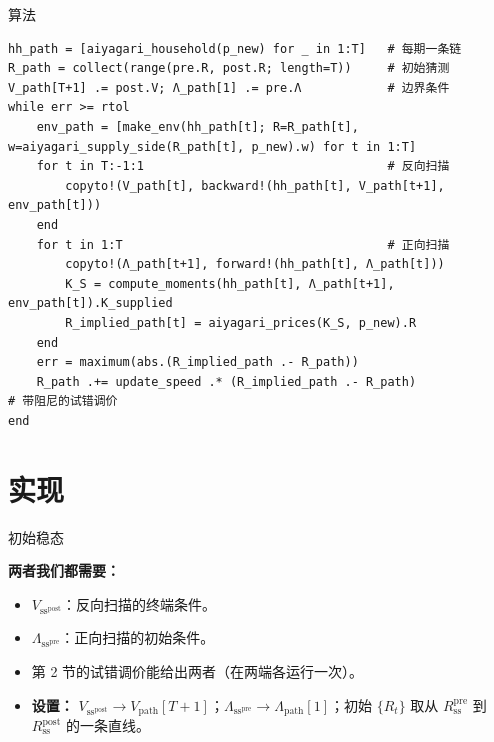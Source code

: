\documentclass[10pt,aspectratio=169]{beamer}
\begin{document}
\begin{frame}[fragile]{算法}
\begin{lstlisting}[basicstyle=\ttfamily\scriptsize]
hh_path = [aiyagari_household(p_new) for _ in 1:T]   # 每期一条链
R_path = collect(range(pre.R, post.R; length=T))     # 初始猜测
V_path[T+1] .= post.V; Λ_path[1] .= pre.Λ            # 边界条件
while err >= rtol
    env_path = [make_env(hh_path[t]; R=R_path[t], w=aiyagari_supply_side(R_path[t], p_new).w) for t in 1:T]
    for t in T:-1:1                                  # 反向扫描
        copyto!(V_path[t], backward!(hh_path[t], V_path[t+1], env_path[t]))
    end
    for t in 1:T                                     # 正向扫描
        copyto!(Λ_path[t+1], forward!(hh_path[t], Λ_path[t]))
        K_S = compute_moments(hh_path[t], Λ_path[t+1], env_path[t]).K_supplied
        R_implied_path[t] = aiyagari_prices(K_S, p_new).R
    end
    err = maximum(abs.(R_implied_path .- R_path))
    R_path .+= update_speed .* (R_implied_path .- R_path)                  # 带阻尼的试错调价
end
\end{lstlisting}
\end{frame}

\section[实现]{实现}

\begin{frame}{初始稳态}

\textbf{两者我们都需要：}

\begin{itemize}
  \item $V_{\mathrm{ss}^{\mathrm{post}}}$：反向扫描的终端条件。
  \item $\Lambda_{\mathrm{ss}^{\mathrm{pre}}}$：正向扫描的初始条件。
\end{itemize}

\vspace{0.4em}

\begin{itemize}
  \item 第 2 节的试错调价能给出两者（在两端各运行一次）。
  \item \textbf{设置：} $V_{\mathrm{ss}^{\mathrm{post}}} \to V_\mathrm{path}[T+1]$；$\Lambda_{\mathrm{ss}^{\mathrm{pre}}} \to \Lambda_\mathrm{path}[1]$；初始 $\{R_t\}$ 取从 $R^{\mathrm{pre}}_{\mathrm{ss}}$ 到 $R^{\mathrm{post}}_{\mathrm{ss}}$ 的一条直线。
\end{itemize}

\end{frame}
\end{document}
